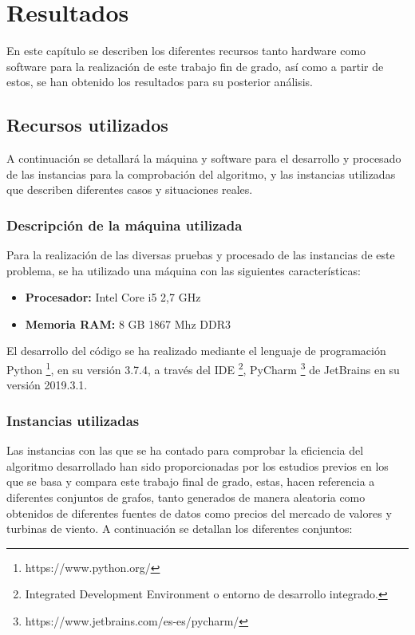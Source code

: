 
\chapter{Resultados} %

\label{Chapter5} %


En este capítulo se describen los diferentes recursos tanto hardware como software para la realización de este trabajo fin de grado, así como a partir de estos, se han obtenido los resultados para su posterior análisis.

\section{Recursos utilizados}
A continuación se detallará la máquina  y software para el desarrollo y procesado de las instancias para la comprobación del algoritmo, y las instancias utilizadas que describen diferentes casos y situaciones reales.

\subsection{Descripción de la máquina utilizada}
Para la realización de las diversas pruebas y procesado de las instancias de este problema, se ha utilizado una máquina con las siguientes características:

\begin{itemize}

\item \textbf{Procesador:} Intel Core i5 2,7 GHz
\item \textbf{Memoria RAM:} 8 GB 1867 Mhz DDR3
\end{itemize}

El desarrollo del código se ha realizado mediante el lenguaje de programación Python \footnote{https://www.python.org/}, en su versión 3.7.4, a través del IDE \footnote{Integrated Development Environment o entorno de desarrollo integrado.}, PyCharm \footnote{https://www.jetbrains.com/es-es/pycharm/} de JetBrains en su versión 2019.3.1.

\subsection{Instancias utilizadas}
Las instancias con las que se ha contado para comprobar la eficiencia del algoritmo desarrollado han sido proporcionadas por los estudios previos en los que se basa y compara este trabajo final de grado, estas, hacen referencia a diferentes conjuntos de grafos, tanto generados de manera aleatoria como obtenidos de diferentes fuentes de datos como precios del mercado de valores y turbinas de viento. A continuación se detallan los diferentes conjuntos:


